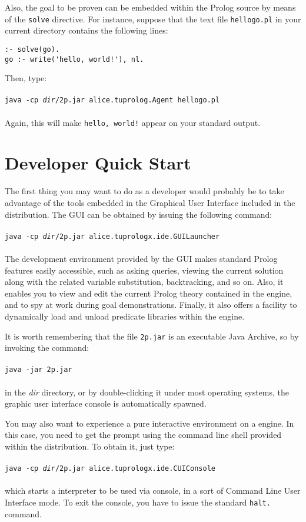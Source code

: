 Also, the goal to be proven can be embedded within the Prolog source by means of the \texttt{solve} directive.
%
For instance, suppose that the text file \texttt{hellogo.pl} in your current directory contains the following lines:
\begin{verbatim}
:- solve(go).
go :- write('hello, world!'), nl.
\end{verbatim}
Then, type:\\\\
%
\texttt{java -cp \emph{dir}/2p.jar alice.tuprolog.Agent hellogo.pl\\\\}
%
Again, this will make \texttt{hello, world!} appear on your standard output.

\section{Developer Quick Start}

The first thing you may want to do as a developer would probably be to take advantage
of the tools embedded in the Graphical User Interface included in the \tuprolog{}
distribution. The GUI can be obtained by issuing the following command:\\\\
%
\texttt{java -cp \emph{dir}/2p.jar alice.tuprologx.ide.GUILauncher\\\\}
%
The development environment provided by the GUI makes standard Prolog features
easily accessible, such as asking queries, viewing the current solution along
with the related variable substitution, backtracking, and so on. Also, it
enables you to view and edit the current Prolog theory contained in the engine,
and to spy \tuprolog{} at work during goal demonstrations. Finally, it also
offers a facility to dynamically load and unload predicate libraries within the
\tuprolog{} engine.

It is worth remembering that the file \texttt{2p.jar} is an executable Java Archive, so
by invoking the command:\\\\
%
\texttt{java -jar 2p.jar\\\\}
%
in the \emph{dir} directory, or by double-clicking it under most operating systems, the
graphic user interface console is automatically spawned.

You may also want to experience a pure interactive environment on a \tuprolog{}
engine. In this case, you need to get the \tuprolog{} prompt using the command line
shell provided within the distribution. To obtain it, just type:\\\\
%
\texttt{java -cp \emph{dir}/2p.jar alice.tuprologx.ide.CUIConsole\\\\}
%
\noindent which starts a \tuprolog{} interpreter to be used via console, in a sort of
Command Line User Interface mode. To exit the \tuprolog{} console, you have to
issue the standard \texttt{halt.} command.
